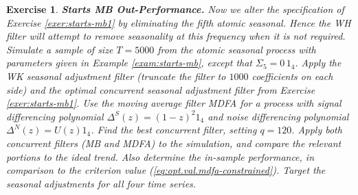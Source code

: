 \documentclass[a4paper]{book}
\newtheorem{Exercise}{Exercise}
\begin{document}
\begin{Exercise} {\bf Starts MB Out-Performance.}  \rm
\label{exer:starts-mb2}
 Now we alter the specification of Exercise \ref{exer:starts-mb1}
 by eliminating the fifth atomic seasonal. Hence the WH filter 
 will attempt to remove seasonality at this frequency when it is
  not required.
 Simulate a sample of size $T=5000$ from the atomic seasonal
  process  with parameters
 given in Example \ref{exam:starts-mb},
  except that  $\Sigma_5 = 0 \, 1_4$.
 Apply the WK seasonal adjustment filter
(truncate the filter to $1000$ coefficients on each side) and the 
 optimal concurrent seasonal adjustment filter
  from Exercise \ref{exer:starts-mb1}.
 Use the moving average filter  MDFA  for a process with signal
 differencing polynomial $\Delta^S (z) = {(1-z)}^2 1_4$ and noise 
  differencing polynomial $\Delta^N (z) = U(z) 1_4$.  Find the best
 concurrent filter, setting $q= 120$.
    Apply both concurrent filters (MB and MDFA)
 to the simulation, and compare the relevant portions to the ideal trend.
 Also determine the in-sample performance, in comparison to the criterion value
 (\ref{eq:opt.val.mdfa-constrained}).   Target the seasonal adjustments
 for all four time series.
\end{Exercise} 
\end{document}
